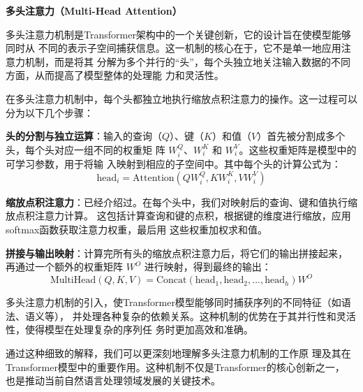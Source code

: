 
\textbf{多头注意力（Multi-Head Attention）}

多头注意力机制是Transformer架构中的一个关键创新，它的设计旨在使模型能够同时从
不同的表示子空间捕获信息。这一机制的核心在于，它不是单一地应用注意力机制，而是将其
分解为多个并行的``头''，每个头独立地关注输入数据的不同方面，从而提高了模型整体的处理能
力和灵活性。

在多头注意力机制中，每个头都独立地执行缩放点积注意力的操作。这一过程可以分为以下几个步骤：

\textbf{头的分割与独立运算}：输入的查询（$Q$）、键（$K$）和值（$V$）首先被分割成多个头，每个头对应一组不同的权重矩
阵 $W_i^Q$、$W_i^K$ 和 $W_i^V$。这些权重矩阵是模型中的可学习参数，用于将输
入映射到相应的子空间中。其中每个头的计算公式为：
\begin{equation}
\text{head}_i = \text{Attention}(QW_i^Q, KW_i^K, VW_i^V)
\end{equation}

\textbf{缩放点积注意力}：已经介绍过。在每个头中，我们对映射后的查询、键和值执行缩放点积注意力计算。
这包括计算查询和键的点积，根据键的维度进行缩放，应用softmax函数获取注意力权重，最后用
这些权重加权求和值。

\textbf{拼接与输出映射}：计算完所有头的缩放点积注意力后，将它们的输出拼接起来，
再通过一个额外的权重矩阵 $W^O$ 进行映射，得到最终的输出：
\begin{equation}
\text{MultiHead}(Q, K, V) = \text{Concat}(\text{head}_1, \text{head}_2, \dots, \text{head}_h)W^O
\end{equation}

多头注意力机制的引入，使Transformer模型能够同时捕获序列的不同特征（如语法、语义等），
并处理各种复杂的依赖关系。这种机制的优势在于其并行性和灵活性，使得模型在处理复杂的序列任
务时更加高效和准确。

通过这种细致的解释，我们可以更深刻地理解多头注意力机制的工作原
理及其在Transformer模型中的重要作用。这种机制不仅是Transformer的核心创新之一，
也是推动当前自然语言处理领域发展的关键技术。

%


